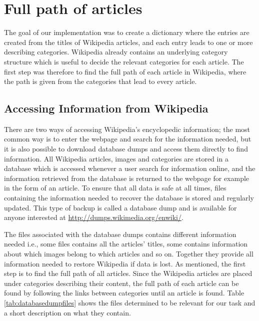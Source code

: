 \section{Full path of articles}
The goal of our implementation was to create a dictionary where the entries are created from the titles of Wikipedia articles, and each entry leads to one or more describing categories. Wikipedia already contains an underlying category structure which is useful to decide the relevant categories for each article. The first step was therefore to find the full path of each article in Wikipedia, where the path is given from the categories that lead to every article. 

\subsection{Accessing Information from Wikipedia}
There are two ways of accessing Wikipedia’s encyclopedic information; the most common way is to enter the webpage and search for the information needed, but it is also possible to download database dumps and access them directly to find information. All Wikipedia articles, images and categories are stored in a database which is accessed whenever a user search for information online, and the information retrieved from the database is returned to the webpage for example in the form of an article. To ensure that all data is safe at all times, files containing the information needed to recover the database is stored and regularly updated.\cite{wiki:databasedownload} This type of backup is called a database dump and is available for anyone interested at \url{http://dumps.wikimedia.org/enwiki/}.

The files associated with the database dumps contains different information needed i.e., some files contains all the articles' titles, some contains information about which images belong to which articles and so on. Together they provide all information needed to restore Wikipedia if data is lost. 
As mentioned, the first step is to find the full path of all articles. Since the Wikipedia articles are placed under categories describing their content, the full path of each article can be found by following the links between categories until an article is found. Table \ref{tab:databasedumpfiles} shows the files determined to be relevant for our task and a short description on what they contain. 


